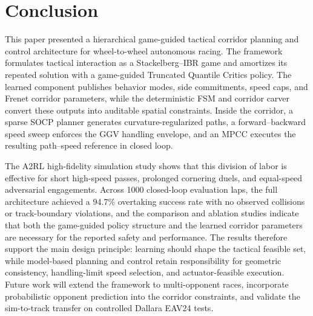 \documentclass{iopjournal}
\begin{document}
\section{Conclusion}\label{sec:conclusion}
This paper presented a hierarchical game-guided tactical corridor planning and
control architecture for wheel-to-wheel autonomous racing.  The framework
formulates tactical interaction as a Stackelberg--IBR game and amortizes its
repeated solution with a game-guided Truncated Quantile Critics policy.  The
learned component publishes behavior modes, side commitments, speed caps, and
Frenet corridor parameters, while the deterministic FSM and corridor carver
convert these outputs into auditable spatial constraints.  Inside the corridor,
a sparse SOCP planner generates curvature-regularized paths, a
forward--backward speed sweep enforces the GGV handling envelope, and an MPCC
executes the resulting path--speed reference in closed loop.

The A2RL high-fidelity simulation study shows that this division of labor is
effective for short high-speed passes, prolonged cornering duels, and
equal-speed adversarial engagements.  Across 1000 closed-loop evaluation laps,
the full architecture achieved a 94.7\% overtaking success rate with no
observed collisions or track-boundary violations, and the comparison and
ablation studies indicate that both the game-guided policy structure and the
learned corridor parameters are necessary for the reported safety and
performance.  The results therefore support the main design principle: learning
should shape the tactical feasible set, while model-based planning and control
retain responsibility for geometric consistency, handling-limit speed
selection, and actuator-feasible execution.  Future work will extend the
framework to multi-opponent races, incorporate probabilistic opponent
prediction into the corridor constraints, and validate the sim-to-track
transfer on controlled Dallara EAV24 tests.






\end{document}
